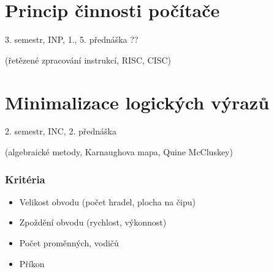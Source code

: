 \documentclass[a4paper, 11pt]{report}
\begin{document}
\chapter{Princip činnosti počítače} \label{cha:7}

3. semestr, INP, 1., 5. přednáška ??

(řetězené zpracování instrukcí, RISC, CISC)















































\chapter{Minimalizace logických výrazů} \label{cha:8}

2. semestr, INC, 2. přednáška

(algebraické metody, Karnaughova mapa, Quine McCluskey)

\subsection{Kritéria}
\begin{itemize}
	\item Velikost obvodu (počet hradel, plocha na čipu)
	\item Zpoždění obvodu (rychlost, výkonnost)
	\item Počet proměnných, vodičů
	\item Příkon
\end{itemize}
\end{document}
